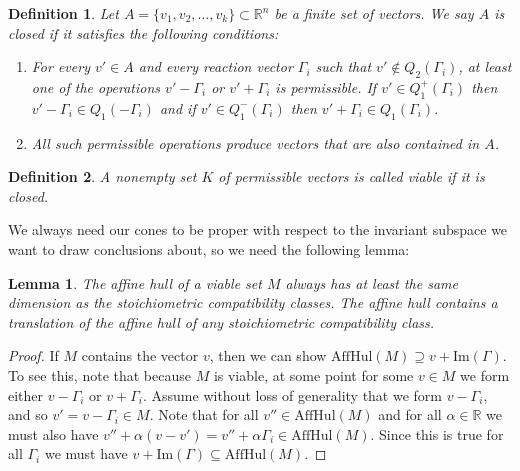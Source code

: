 \documentclass{article}
\newtheorem{lem}{Lemma}
\newtheorem{define}{Definition}
\begin{document}
\begin{define}
\label{def:closed}
Let \( A = \{v_1, v_2, \dots, v_k\} \subset \mathbb{R}^n \) be a finite set of vectors. We say \( A \) is \textit{closed} if it satisfies the following conditions:
\begin{enumerate}
    \item For every \( v' \in A \) and every reaction vector \( \Gamma_i \) such that \( v' \notin Q_2(\Gamma_i) \), at least one of the operations \( v' - \Gamma_i \) or \( v' + \Gamma_i \) is permissible. If $v' \in Q_1^+(\Gamma_i)$ then $v' - \Gamma_i \in Q_1(-\Gamma_i)$ and if $v' \in Q_1^-(\Gamma_i)$ then $v' + \Gamma_i \in Q_1(\Gamma_i)$.
    \item All such permissible operations produce vectors that are also contained in \( A \).
\end{enumerate}
\end{define}

\begin{define}
\label{def:viable set}
A nonempty set \( K \) of permissible vectors is called \textit{viable} if it is closed.
\end{define}









We always need our cones to be proper with respect to the invariant subspace we want to draw conclusions about, so we need the following lemma:

\begin{lem}
\label{lem_viable_at_least_stoich_dimension}
    The affine hull of a viable set $M$  always has at least the same dimension as the stoichiometric compatibility classes. The affine hull contains a translation of the affine hull of any stoichiometric compatibility class.
\end{lem}

\begin{proof}
    If $M$ contains the vector $v$, then we can show $\mbox{AffHul}(M) \supseteq v + \mbox{Im}(\Gamma)$. To see this, note that because $M$ is viable, at some point for some $v \in M$ we form either $v - \Gamma_i$ or $v + \Gamma_i$. Assume without loss of generality that we form $v- \Gamma_i$, and so $v' = v - \Gamma_i \in M$. Note that for all $v'' \in \mbox{AffHul}(M)$ and for all $\alpha \in \mathbb{R}$ we must also have $v'' + \alpha(v - v') = v'' + \alpha \Gamma_i \in \mbox{AffHul}(M)$. Since this is true for all $\Gamma_i$ we must have $ v + \mbox{Im}(\Gamma) \subseteq \mbox{AffHul}(M)$. 
    
    
\end{proof}
\end{document}
